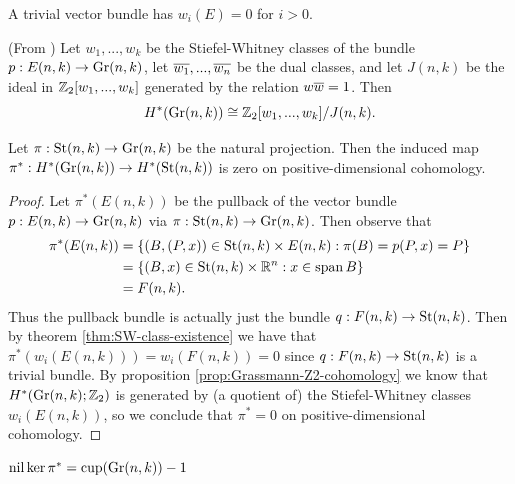 \begin{remark}
    A trivial vector bundle has $w_i(E) = 0$ for $i > 0$.
\end{remark}

\begin{proposition}\label{prop:Grassmann-Z2-cohomology}
    (From \cite{jaworowski2006additive})
    Let $w_1,...,w_k$ be the Stiefel-Whitney classes of the bundle $p : E(n,k) \to \Gr(n,k)$, let $\Bar{w_1},...,\Bar{w_n}$ be the dual classes, and let $J(n,k)$ be the ideal in $\Z_2[w_1,...,w_k]$ generated by the relation $w \Bar{w} = 1$.
    Then
    \[
        H^*(\Gr(n,k)) \cong \Z_2[w_1,...,w_k]/J(n,k).
    \]
\end{proposition}

\begin{proposition}\label{prop:Stiefel-Grassmann-projection-kernel}
    Let $\pi : \St(n,k) \to \Gr(n,k)$ be the natural projection.
    Then the induced map $\pi^* : H^*(\Gr(n,k)) \to H^*(\St(n,k))$ is zero on positive-dimensional cohomology.
    \begin{proof}
        Let $\pi^*(E(n,k))$ be the pullback of the vector bundle $p : E(n,k) \to \Gr(n,k)$ via $\pi : \St(n,k) \to \Gr(n,k)$.
        Then observe that
        \begin{align*}
            \pi^*(E(n,k))
            &= \set{(B,(P,x)) \in \St(n,k) \times E(n,k) : \pi(B) = p(P,x) = P} \\
            &= \set{(B,x) \in \St(n,k) \times \R^n : x \in \Span B} \\
            &= F(n,k).
        \end{align*}
        Thus the pullback bundle is actually just the bundle $q : F(n,k) \to \St(n,k)$.
        Then by theorem \ref{thm:SW-class-existence} we have that $\pi^*(w_i(E(n,k))) = w_i(F(n,k)) = 0$ since $q : F(n,k) \to \St(n,k)$ is a trivial bundle.
        By proposition \ref{prop:Grassmann-Z2-cohomology} we know that $H^*(\Gr(n,k);\Z_2)$ is generated by (a quotient of) the Stiefel-Whitney classes $w_i(E(n,k))$, so we conclude that $\pi^* = 0$ on positive-dimensional cohomology.
    \end{proof}
\end{proposition}

\begin{corollary}\label{cor:nil-st-gr-proj-eq-cup-gr}
    $\nil \ker \pi^* = \cupln(\Gr(n,k)) - 1$
\end{corollary}

